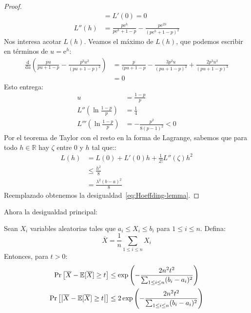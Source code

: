 \begin{proof}
\begin{align*}
         &= L'(0)
          = 0 \\
       L''(h)
         &= \frac{p \mathrm{e}^h}{p \mathrm{e}^h + 1 - p}
              - \frac{p \mathrm{e}^{2 h}}{(p \mathrm{e}^h + 1 - p)^2}
     \end{align*}
     Nos interesa acotar \(L(h)\).
     Veamos el máximo de \(L(h)\),
     que podemos escribir en términos de \(u = \mathrm{e}^h\):
     \begin{align*}
       \frac{\mathrm{d}}{\mathrm{d} u}
          \left( \frac{p u}{p u + 1 - p}
                    - \frac{p^2 u^2}{(p u + 1 - p)^2} \right)
         &= \frac{p}{(p u + 1 - p}
              - \frac{3 p^2 u}{(p u + 1 - p)^2}
              + \frac{2 p^3 u^2}{(p u + 1 - p)^3} \\
         &= 0
     \end{align*}
     Esto entrega:
     \begin{align*}
       u
         &= \frac{1 - p}{p} \\
       L''\left( \ln \frac{1 - p}{p} \right)
         &= \frac{1}{4} \\
       L'''\left( \ln \frac{1 - p}{p} \right)
         &= - \frac{p^2}{8 (p - 1)^2}
          < 0
     \end{align*}
     Por el teorema de Taylor con el resto en la forma de Lagrange,
     sabemos que para todo \(h \in \mathbb{R}\)
     hay \(\zeta\) entre \num{0} y \(h\) tal que::
     \begin{align*}
       L(h)
         &=   L(0)
                + L'(0) h
                + \frac{1}{2!} L''(\zeta) h^2 \\
         &\le \frac{h^2}{8} \\
         &=   \frac{\lambda^2 (b - a)^2}{8}
     \end{align*}
     Reemplazado obtenemos la desigualdad~\eqref{eq:Hoeffding-lemma}.
     \qedhere
  \end{proof}
  Ahora la desigualdad principal:
  \begin{theorem}
    \label{theo:Hoeffding}
    Sean \(X_i\) variables aleatorias tales que \(a_i \le X_i \le b_i\)
    para \(1 \le i \le n\).
    Defina:
    \begin{equation*}
      \overline{X}
        = \frac{1}{n} \sum_{1 \le i \le n} X_i
    \end{equation*}
    Entonces,
    para \(t > 0\):
    \begin{align}
      \Pr\left[ \overline{X} - \operatorname{\mathbb{E}}[ \overline{X} ] \ge t \right]
        &\le \exp\left(
                    - \frac{2 n^2 t^2}{\sum_{1 \le i \le n} (b_i - a_i)^2}
                 \right)
           \label{eq:Hoeffding-1} \\
      \Pr\left[\left\lvert
                 \overline{X} - \operatorname{\mathbb{E}}[ \overline{X} ] \ge t \right\rvert\right]
        &\le 2 \exp\left(
                      - \frac{2 n^2 t^2}{\sum_{1 \le i \le n} (b_i - a_i)^2}
                   \right)
           \label{eq:Hoeffding-2}
    \end{align}
  \end{theorem}
